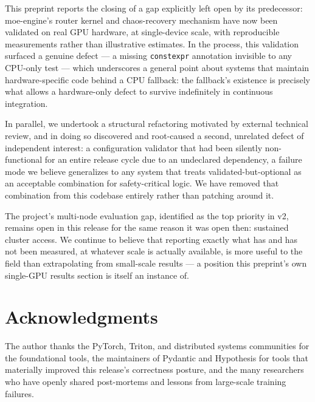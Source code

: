 \documentclass[11pt]{article}
\begin{document}
This preprint reports the closing of a gap explicitly left open by its
predecessor: moe-engine's router kernel and chaos-recovery mechanism have
now been validated on real GPU hardware, at single-device scale, with
reproducible measurements rather than illustrative estimates. In the
process, this validation surfaced a genuine defect --- a missing
\texttt{constexpr} annotation invisible to any CPU-only test --- which
underscores a general point about systems that maintain hardware-specific
code behind a CPU fallback: the fallback's existence is precisely what
allows a hardware-only defect to survive indefinitely in continuous
integration.

In parallel, we undertook a structural refactoring motivated by external
technical review, and in doing so discovered and root-caused a second,
unrelated defect of independent interest: a configuration validator that
had been silently non-functional for an entire release cycle due to an
undeclared dependency, a failure mode we believe generalizes to any system
that treats validated-but-optional as an acceptable combination for
safety-critical logic. We have removed that combination from this codebase
entirely rather than patching around it.

The project's multi-node evaluation gap, identified as the top priority in
v2, remains open in this release for the same reason it was open then:
sustained cluster access. We continue to believe that reporting exactly
what has and has not been measured, at whatever scale is actually
available, is more useful to the field than extrapolating from small-scale
results --- a position this preprint's own single-GPU results section is
itself an instance of.

\section*{Acknowledgments}

The author thanks the PyTorch, Triton, and distributed systems communities
for the foundational tools, the maintainers of Pydantic and Hypothesis for
tools that materially improved this release's correctness posture, and the
many researchers who have openly shared post-mortems and lessons from
large-scale training failures.
\end{document}
